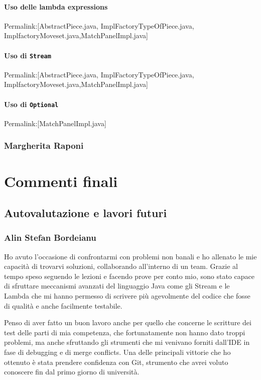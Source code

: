 \documentclass[a4paper,12pt]{report}
\begin{document}
\subsubsection{Uso delle lambda expressions}
Permalink:[AbstractPiece.java, ImplFactoryTypeOfPiece.java, ImplfactoryMoveset.java,MatchPanelImpl.java]

\subsubsection{Uso di \texttt{Stream}}
Permalink:[AbstractPiece.java, ImplFactoryTypeOfPiece.java, ImplfactoryMoveset.java,MatchPanelImpl.java]

\subsubsection{Uso di \texttt{Optional}}
Permalink:[MatchPanelImpl.java]

\subsection{Margherita Raponi}



\chapter{Commenti finali}


\section{Autovalutazione e lavori futuri}

\subsection{Alin Stefan Bordeianu}
Ho avuto l'occasione di confrontarmi con problemi non banali e ho allenato le mie capacità di trovarvi soluzioni, collaborando all'interno di un team. Grazie al tempo speso seguendo le lezioni e facendo prove per conto mio, sono stato capace di sfruttare meccanismi avanzati del linguaggio Java come gli Stream e le Lambda che mi hanno permesso di scrivere più agevolmente del codice che fosse di qualità e anche facilmente testabile.

Penso di aver fatto un buon lavoro anche per quello che concerne le scritture dei test delle parti di mia competenza, che fortunatamente non hanno dato troppi problemi, ma anche sfruttando gli strumenti che mi venivano forniti dall'IDE in fase di debugging e di merge conflicts. Una delle principali vittorie che ho ottenuto è stata prendere confidenza con Git, strumento che avrei voluto conoscere fin dal primo giorno di università. 
\end{document}
